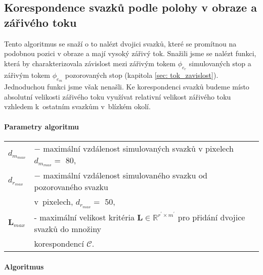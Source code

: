 \newpage
\subsection{Korespondence svazků podle polohy v obraze a zářivého toku}
\label{sec: poloha_tok}
	Tento algoritmus se snaží o to nalézt dvojici svazků, které se promítnou na podobnou pozici v obraze a mají vysoký zářivý tok. Snažili jsme se nalézt funkci, která by charakterizovala závislost mezi zářivým tokem $\phi_{e_{r}}$ simulovaných stop a zářivým tokem $\phi_{e_{m}}$ pozorovaných stop (kapitola \ref{sec: tok_zavislost}). Jednoduchou funkci jsme však nenašli. Ke korespondenci svazků budeme místo absolutní velikosti zářivého toku využívat relativní velikost zářivého toku vzhledem k~ostatním svazkům v~blízkém okolí. 

\paragraph{Parametry algoritmu}
\hspace{1mm}
	 
	 \begin{tabular}{l L{13.5cm}}
	 $d_{m_{max}}$ & $-$ maximální vzdálenost simulovaných svazků v pixelech  $d_{m_{max}} = $ \SI{80}{\px},\\
	 $d_{r_{max}}$ & $-$ maximální vzdálenost simulovaného svazku od pozorovaného svazku  \\
	 & v~pixelech, $d_{r_{max}} = $ \SI{50}{\px},\\
	 $\mathbf{L}_{max}$ &  - maximální velikost kritéria  $\mathbf{L} \in \mathbb{R}^{r^\prime\times m^\prime}$ pro přidání dvojice svazků do množiny \\
	 & korespondencí $\mathcal{C}$. \\
	 \end{tabular}

\paragraph{Algoritmus}

